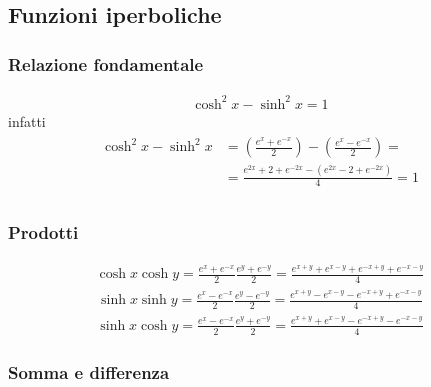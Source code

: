 \documentclass[letterpaper,10pt,italian]{jupyterBook}
\begin{document}
\subsection{Funzioni iperboliche}
\label{\detokenize{ch/precalculus/exponential_logarithm-notes:funzioni-iperboliche}}\label{\detokenize{ch/precalculus/exponential_logarithm-notes:math-hs-exp-log-notes-hyp}}\subsubsection*{Relazione fondamentale}
\begin{equation*}
\begin{split}\cosh^2 x - \sinh^2 x = 1\end{split}
\end{equation*}
\sphinxAtStartPar
infatti
\begin{equation*}
\begin{split}\begin{aligned}
\cosh^2 x - \sinh^2 x & = \left(\frac{e^x + e^{-x}}{2}\right) - \left(\frac{e^x - e^{-x}}{2}\right) = \\
& = \frac{e^{2x} + 2 + e^{-2x} - \left( e^{2x} - 2 + e^{-2x}\right)}{4} = 1 \\
\end{aligned}\end{split}
\end{equation*}\subsubsection*{Prodotti}
\begin{equation*}
\begin{split}\cosh x \cosh y = \frac{e^x+e^{-x}}{2} \frac{e^y+e^{-y}}{2} = \frac{e^{x+y} + e^{x-y} + e^{-x+y} + e^{-x-y}}{4}\end{split}
\end{equation*}\begin{equation*}
\begin{split}\sinh x \sinh y = \frac{e^x-e^{-x}}{2} \frac{e^y-e^{-y}}{2} = \frac{e^{x+y} - e^{x-y} - e^{-x+y} + e^{-x-y}}{4}\end{split}
\end{equation*}\begin{equation*}
\begin{split}\sinh x \cosh y = \frac{e^x-e^{-x}}{2} \frac{e^y+e^{-y}}{2} = \frac{e^{x+y} + e^{x-y} - e^{-x+y} - e^{-x-y}}{4}\end{split}
\end{equation*}\subsubsection*{Somma e differenza}
\end{document}
